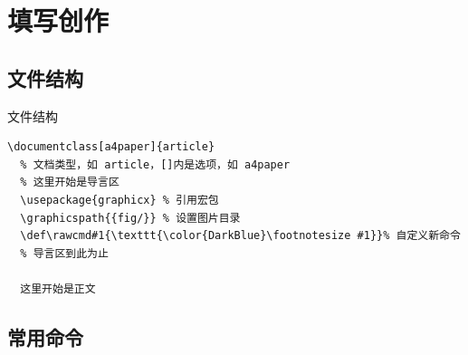\section{填写创作}



\subsection{文件结构}

\begin{frame}[fragile]{文件结构}
    \lstset{language=[LaTeX]TeX}
    \begin{lstlisting}[basicstyle=\ttfamily]
  \documentclass[a4paper]{article}
  % 文档类型，如 article，[]内是选项，如 a4paper
  % 这里开始是导言区
  \usepackage{graphicx} % 引用宏包
  \graphicspath{{fig/}} % 设置图片目录
  \def\rawcmd#1{\texttt{\color{DarkBlue}\footnotesize #1}}% 自定义新命令
  % 导言区到此为止
  
  这里开始是正文
  \end{lstlisting}
\end{frame}

\subsection{常用命令}

